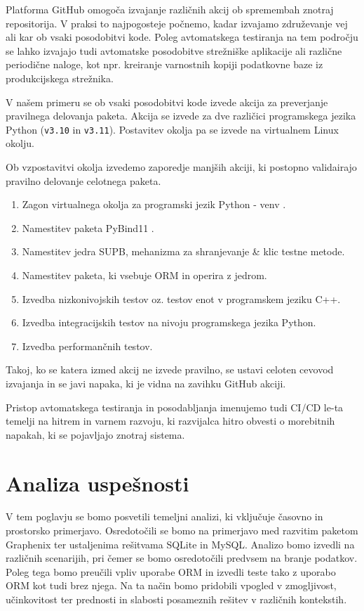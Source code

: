 \documentclass[a4paper,12pt,openright]{book}
\begin{document}
   Platforma GitHub omogoča izvajanje različnih akcij ob spremembah znotraj repositorija. V praksi to najpogosteje počnemo, kadar izvajamo združevanje vej ali kar ob vsaki posodobitvi kode. Poleg avtomatskega testiranja na tem področju se lahko izvajajo tudi avtomatske posodobitve strežniške aplikacije ali različne periodične naloge, kot npr. kreiranje varnostnih kopiji podatkovne baze iz produkcijskega strežnika.

   V našem primeru se ob vsaki posodobitvi kode izvede akcija za preverjanje pravilnega delovanja paketa. Akcija se izvede za dve različici programskega jezika Python ({\tt v3.10} in {\tt v3.11}). Postavitev okolja pa se izvede na virtualnem Linux okolju.

   Ob vzpostavitvi okolja izvedemo zaporedje manjših akciji, ki postopno validairajo pravilno delovanje celotnega paketa.
   \begin{enumerate}
       \item Zagon virtualnega okolja za programski jezik Python - venv \cite{wang2022smartpip}.
       \item Namestitev paketa PyBind11 \cite{PYBIND11_GITHUB}.
       \item Namestitev jedra SUPB, mehanizma za shranjevanje \& klic testne metode.
       \item Namestitev paketa, ki vsebuje ORM in operira z jedrom.
       \item Izvedba nizkonivojskih testov oz. testov enot v programskem jeziku C++.
       \item Izvedba integracijskih testov na nivoju programskega jezika Python.
       \item Izvedba performančnih testov.
   \end{enumerate}

    \noindent
   Takoj, ko se katera izmed akcij ne izvede pravilno, se ustavi celoten cevovod izvajanja in se javi napaka, ki je vidna na zavihku GitHub akciji.

   Pristop avtomatskega testiranja in posodabljanja imenujemo tudi CI/CD le-ta temelji na hitrem in varnem razvoju, ki razvijalca hitro obvesti o morebitnih napakah, ki se pojavljajo znotraj sistema.
    
\chapter{Analiza uspešnosti}
\label{ch2}

    V tem poglavju se bomo posvetili temeljni analizi, ki vključuje časovno in prostorsko primerjavo. Osredotočili se bomo na primerjavo med razvitim paketom Graphenix ter ustaljenima rešitvama SQLite in MySQL. Analizo bomo izvedli na različnih scenarijih, pri čemer se bomo osredotočili predvsem na branje podatkov. Poleg tega bomo preučili vpliv uporabe ORM in izvedli teste tako z uporabo ORM kot tudi brez njega. Na ta način bomo pridobili vpogled v zmogljivost, učinkovitost ter prednosti in slabosti posameznih rešitev v različnih kontekstih.
\end{document}
